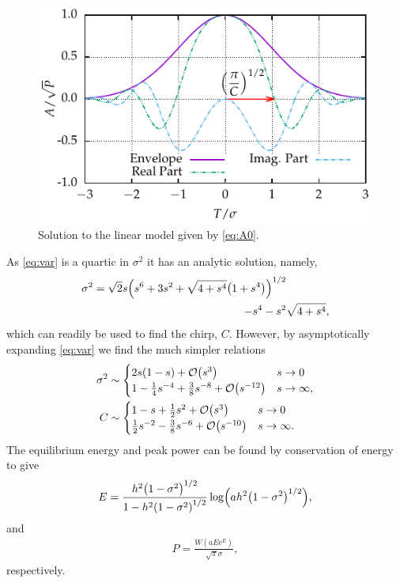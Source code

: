 \documentclass[9pt,twocolumn,twoside]{osajnl}
\let\originalleft\left
\let\originalright\right
\renewcommand{\left}{\mathopen{}\mathclose\bgroup\originalleft}
\renewcommand{\right}{\aftergroup\egroup\originalright}
\providecommand{\bigO}[1]{\ensuremath{\mathop{}\mathopen{}\mathcal{O}\mathopen{}\left(#1\right)}} %
\begin{document}
\begin{figure}[tbp]
	\centering
	\includegraphics{Figures/Sample_Gauss}
	\caption{Solution to the linear model given by \eqref{eq:A0}.}
	\label{fig:samplegauss}
\end{figure}

As \eqref{eq:var} is a quartic in $\sigma^2$ it has an analytic solution, namely,
\begin{equation}
	\begin{split}
		\sigma^2 = \sqrt{2} s \left( s^6 + 3s^2 + \sqrt{4 + s^4} \left( 1 + s^4 \right) \right)^{1/2} & \\
		- s^4 - s^2 & \sqrt{4 + s^4},
		\label{eq:equilvar}
	\end{split}
\end{equation}
which can readily be used to find the chirp, $C$. However, by asymptotically expanding \eqref{eq:var} we find the much simpler relations
\begin{align}
	\sigma^2 &\sim
	\begin{cases}
		2s(1 - s) + \bigO{s^3} & s \rightarrow 0 \\
		1 - \frac{1}{4}s^{-4} + \frac{3}{8}s^{-8} + \bigO{s^{-12}} & s \rightarrow \infty,
	\end{cases} \\
	C &\sim
	\begin{cases}
		1 - s + \frac{1}{2}s^2 + \bigO{s^3} & s \rightarrow 0 \\
		\frac{1}{2}s^{-2} - \frac{3}{8}s^{-6} + \bigO{s^{-10}} & s \rightarrow \infty.
	\end{cases}
\end{align}
The equilibrium energy and peak power can be found by conservation of energy to give
\begin{align}
	E = \frac{h^2 \left( 1 - \sigma^2 \right)^{1/2}}{1 - h^2 \left( 1 - \sigma^2 \right)^{1/2}} \log \left( a h^2 \left( 1 - \sigma^2 \right)^{1/2} \right),
\end{align}
and
\begin{align}
	P = \frac{W(a E \textrm{e}^E)}{\sqrt{\pi} \sigma},
	\label{eq:equilpower}
\end{align}
respectively.
\end{document}
